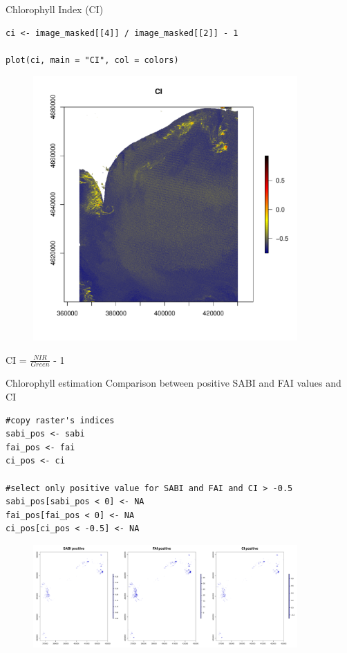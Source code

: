 \documentclass[10pt]{beamer}
\begin{document}
\begin{frame}[fragile]{Chlorophyll Index (CI)}
\begin{lstlisting}[firstnumber = 66]
ci <- image_masked[[4]] / image_masked[[2]] - 1

plot(ci, main = "CI", col = colors)    
\end{lstlisting}
 \begin{minipage}{0.6\textwidth}
 \begin{figure}
\centering
\includegraphics[width=0.9\textwidth]{images/ci.pdf} 
\end{figure}
\end{minipage} 
\begin{minipage}[b]{.35\textwidth}
\centering
\Large CI = \Large $\frac{NIR}{Green}$ - 1
\end{minipage}
\end{frame}

\begin{frame}[fragile]{Chlorophyll estimation}
\small Comparison between positive SABI and FAI values and CI
\begin{lstlisting}[firstnumber = 69]
#copy raster's indices
sabi_pos <- sabi
fai_pos <- fai
ci_pos <- ci

#select only positive value for SABI and FAI and CI > -0.5
sabi_pos[sabi_pos < 0] <- NA
fai_pos[fai_pos < 0] <- NA
ci_pos[ci_pos < -0.5] <- NA
\end{lstlisting}
\begin{figure}
    \centering
    \includegraphics[width = 0.9\textwidth]{images/positive.pdf}
\end{figure}
\end{frame}
\end{document}
